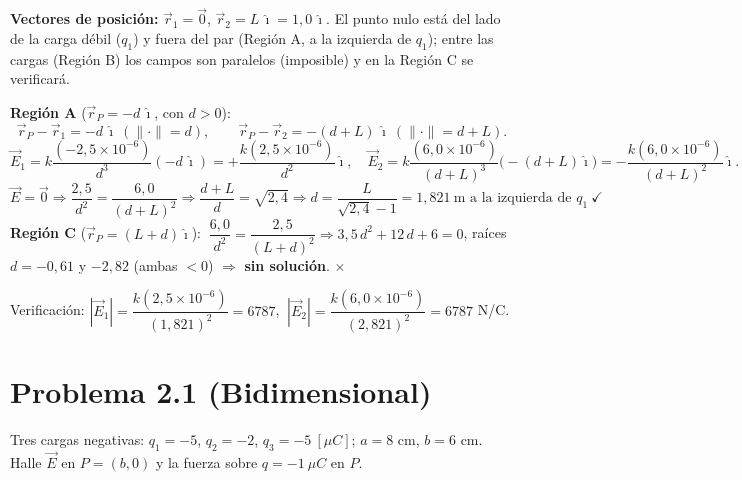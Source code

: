 \documentclass[12pt,letterpaper]{article}
\begin{document}
\medskip
\noindent\textbf{Vectores de posici\'on:} $\vec r_1=\vec 0$, $\vec r_2=L\,\hat\imath=1{,}0\,\hat\imath$.
El punto nulo est\'a del lado de la carga d\'ebil ($q_1$) y fuera del par (Regi\'on A, a la izquierda de
$q_1$); entre las cargas (Regi\'on B) los campos son paralelos (imposible) y en la Regi\'on C se
verificar\'a.

\medskip
\noindent\textbf{Regi\'on A} ($\vec r_P=-d\,\hat\imath$, con $d>0$):
\[
    \vec r_P-\vec r_1 = -d\,\hat\imath\ (\lVert\cdot\rVert=d),\qquad
    \vec r_P-\vec r_2 = -(d+L)\,\hat\imath\ (\lVert\cdot\rVert=d+L).
\]
\[
    \vec E_1 = k\frac{(-2{,}5\times10^{-6})}{d^{3}}(-d\,\hat\imath)=+\frac{k(2{,}5\times10^{-6})}{d^{2}}\hat\imath,\quad
    \vec E_2 = k\frac{(6{,}0\times10^{-6})}{(d+L)^{3}}\big(-(d+L)\hat\imath\big)=-\frac{k(6{,}0\times10^{-6})}{(d+L)^{2}}\hat\imath.
\]
\[
    \vec E=\vec 0 \Rightarrow \frac{2{,}5}{d^{2}}=\frac{6{,}0}{(d+L)^{2}}
    \Rightarrow \frac{d+L}{d}=\sqrt{2{,}4}
    \Rightarrow \boxed{d=\frac{L}{\sqrt{2{,}4}-1}=1{,}821\ \text{m a la izquierda de }q_1}\ \checkmark
\]
\textbf{Regi\'on C} ($\vec r_P=(L+d)\hat\imath$): $\ \dfrac{6{,}0}{d^{2}}=\dfrac{2{,}5}{(L+d)^{2}}
\Rightarrow 3{,}5\,d^{2}+12\,d+6=0$, ra\'ices $d=-0{,}61$ y $-2{,}82$ (ambas $<0$)
$\Rightarrow$ \textbf{sin soluci\'on}. $\times$

\smallskip
\noindent Verificaci\'on: $|\vec E_1|=\dfrac{k(2{,}5\times10^{-6})}{(1{,}821)^2}=6787$,
$\ |\vec E_2|=\dfrac{k(6{,}0\times10^{-6})}{(2{,}821)^2}=6787$ N/C. \checkmark

\clearpage
\section*{\textcolor{ubbblue}{Problema 2.1 (Bidimensional)}}
Tres cargas negativas: $q_1=-5$, $q_2=-2$, $q_3=-5\ [\mu C]$; $a=8$ cm, $b=6$ cm. Halle $\vec E$ en
$P=(b,0)$ y la fuerza sobre $q=-1\ \mu C$ en $P$.
\end{document}
